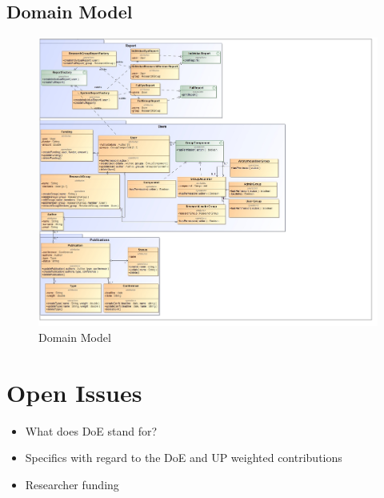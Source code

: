 \documentclass{article}
\begin{document}
		\subsection{Domain Model}
			\begin{figure}
					\includegraphics[width=\textwidth]{DomainModel/DomainModel}
					\caption{Domain Model}
			\end{figure}
	\section{Open Issues}
	\begin{itemize}
		\item What does DoE stand for?
		\item Specifics with regard to the DoE and UP weighted contributions
		\item Researcher funding
	\end{itemize}
\end{document}
